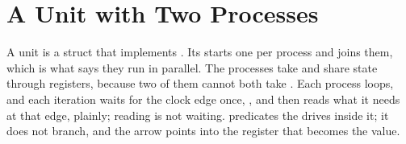 \section{A Unit with Two Processes}
\label{sec:x-unit}

A unit is a struct that implements . Its 
starts one  per process and joins them, which is what
says they run in parallel. The processes take  and share
state through registers, because two of them cannot both take
. Each process loops, and each iteration waits for
the clock edge once, , and then reads what
it needs at that edge, plainly; reading is not waiting. 
predicates the drives inside it; it does not branch, and the arrow
points into the register that becomes the value.


